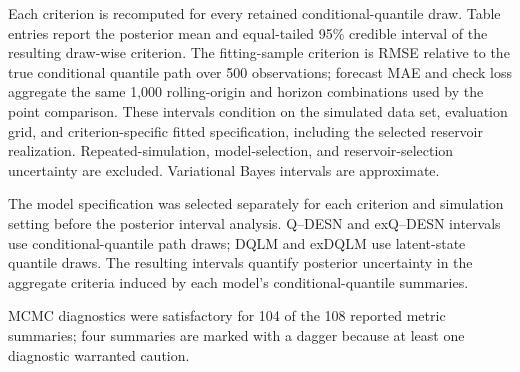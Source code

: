 Each criterion is recomputed for every retained conditional-quantile draw. Table entries report the posterior mean and equal-tailed 95\% credible interval of the resulting draw-wise criterion. The fitting-sample criterion is RMSE relative to the true conditional quantile path over 500 observations; forecast MAE and check loss aggregate the same 1,000 rolling-origin and horizon combinations used by the point comparison. These intervals condition on the simulated data set, evaluation grid, and criterion-specific fitted specification, including the selected reservoir realization. Repeated-simulation, model-selection, and reservoir-selection uncertainty are excluded. Variational Bayes intervals are approximate.

The model specification was selected separately for each criterion and simulation setting before the posterior interval analysis. Q--DESN and exQ--DESN intervals use conditional-quantile path draws; DQLM and exDQLM use latent-state quantile draws. The resulting intervals quantify posterior uncertainty in the aggregate criteria induced by each model's conditional-quantile summaries.

MCMC diagnostics were satisfactory for 104 of the 108 reported metric summaries; four summaries are marked with a dagger because at least one diagnostic warranted caution.
